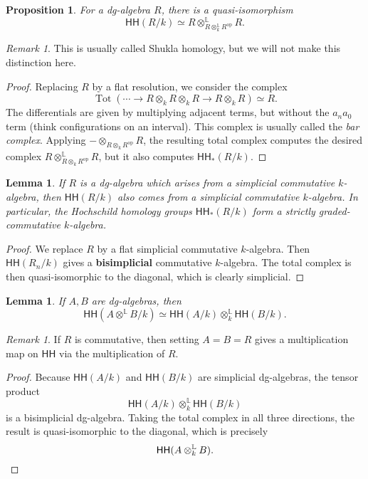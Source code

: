\documentclass[10pt]{amsart}
\newtheorem{prop}[thm]{Proposition}
\newtheorem{lem}[thm]{Lemma}
\theoremstyle{definition}
\theoremstyle{remark}
\newtheorem{rmk}[thm]{Remark}
\theoremstyle{plain}
\theoremstyle{definition}
\theoremstyle{remark}
\renewcommand{\L}{\mathbb{L}}
\newcommand{\mr}[1]{\mathrm{#1}}
\newcommand{\ms}[1]{\mathsf{#1}}
\newcommand{\1}{\mathbf{1}}
\newcommand{\2}{\mathbf{2}}
\newcommand{\3}{\mathbf{3}}
\newcommand{\HH}{\ms{HH}}
\DeclareMathOperator{\op}{op}
\DeclareMathOperator{\Tot}{Tot}
\begin{document}
\begin{prop}
    For a dg-algebra $R$, there is a quasi-isomorphism
    \[ \HH(R/k) \simeq R \otimes_{R \otimes_k^{\L} R^{\mr{op}}}^{\L} R. \]
\end{prop}

\begin{rmk}
    This is usually called Shukla homology, but we will not make this distinction here.
\end{rmk}

\begin{proof}
    Replacing $R$ by a flat resolution, we consider the complex
    \[ \Tot(\cdots \to R \otimes_k R \otimes_k R \to R \otimes_k R) \simeq R. \]
    The differentials are given by multiplying adjacent terms, but without the $a_n a_0$ term (think configurations on an interval). This complex is usually called the \textit{bar complex}. Applying $- \otimes_{R \otimes_k R^{\op}} R$, the resulting total complex computes the desired complex $R \otimes_{R \otimes_k R^{\op}}^{\L} R$, but it also computes $\HH_*(R/k)$.
\end{proof}

\begin{lem}
    If $R$ is a dg-algebra which arises from a simplicial commutative $k$-algebra, then $\HH(R/k)$ also comes from a simplicial commutative $k$-algebra. In particular, the Hochschild homology groups $\HH_*(R/k)$ form a strictly graded-commutative $k$-algebra.
\end{lem}

\begin{proof}
    We replace $R$ by a flat simplicial commutative $k$-algebra. Then $\HH(R_n/k)$ gives a \textbf{bisimplicial} commutative $k$-algebra. The total complex is then quasi-isomorphic to the diagonal, which is clearly simplicial.
\end{proof}

\begin{lem}
    If $A, B$ are dg-algebras, then
    \[ \HH(A \otimes^{\L} B/k) \simeq \HH(A/k) \otimes_k^{\L} \HH(B/k). \]
\end{lem}

\begin{rmk}
    If $R$ is commutative, then setting $A=B=R$ gives a multiplication map on $\HH$ via the multiplication of $R$.
\end{rmk}

\begin{proof}
    Because $\HH(A/k)$ and $\HH(B/k)$ are simplicial dg-algebras, the tensor product
    \[ \HH(A/k) \otimes_k^{\L} \HH(B/k) \]
    is a bisimplicial dg-algebra. Taking the total complex in all three directions, the result is quasi-isomorphic to the diagonal, which is precisely
    \[ \HH(A\otimes_k^{\L} B). \qedhere \]
\end{proof}
\end{document}
